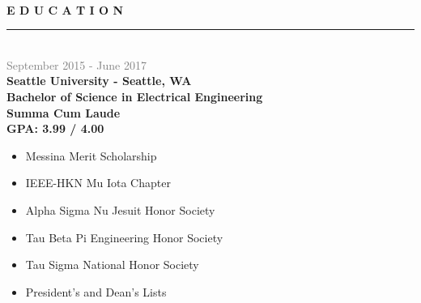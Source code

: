 \documentclass[letterpage]{article}
\begin{document}
\vspace*{10px}\\ %
\begin{minipage}[t]{0.424\linewidth}
\vspace{0pt}
\textbf{\fontsize{14px}{1px}\selectfont E D U C A T I O N}\\
\noindent\rule{2.45in}{0.1pt}
\vspace{7px}\\
\textcolor{gray}{September 2015 - June 2017}\\
\textbf{\textsf{Seattle University - Seattle, WA}}\\
\textbf{Bachelor of Science in Electrical Engineering}\\
\textbf{Summa Cum Laude}\\
\textbf{GPA: 3.99 / 4.00}
\begin{itemize}[leftmargin=*,labelindent=5mm,labelsep=7mm]
\renewcommand\labelitemi{\rule[1mm]{0.33mm}{0.33mm}}
\renewcommand\labelitemii{$\blacksquare$}
\item
  Messina Merit Scholarship

\item
  IEEE-HKN Mu Iota Chapter
  {}
\item
  Alpha Sigma Nu Jesuit Honor Society
  {}
\item
  Tau Beta Pi Engineering Honor Society
\item
  Tau Sigma National Honor Society
\item
  President's and Dean's Lists
  {}
\end{itemize}
\vspace{7px}


\end{minipage}
\end{document}

